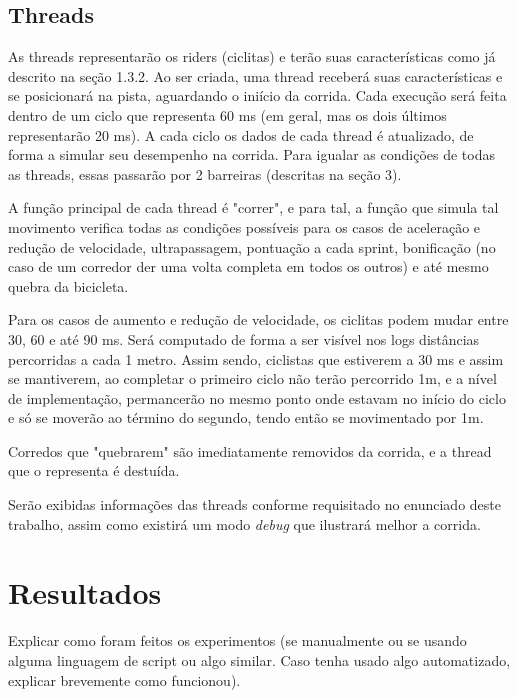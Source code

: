 \documentclass[12pt,a4paper]{article}
\begin{document}
\subsection{Threads}

    As threads representarão os riders (ciclitas) e terão suas características como já descrito na seção 1.3.2. Ao ser criada, uma thread receberá suas características e se posicionará na pista, aguardando o iniício da corrida. Cada execução será feita dentro de um ciclo que representa 60 ms (em geral, mas os dois últimos representarão 20 ms). A cada ciclo os dados de cada thread é atualizado, de forma a simular seu desempenho na corrida. Para igualar as condições de todas as threads, essas passarão por 2 barreiras (descritas na seção 3).
    
    A função principal de cada thread é "correr", e para tal, a função que simula tal movimento verifica todas as condições possíveis para os casos de aceleração e redução de velocidade, ultrapassagem, pontuação a cada sprint, bonificação (no caso de um corredor der uma volta completa em todos os outros) e até mesmo quebra da bicicleta.
    
    Para os casos de aumento e redução de velocidade, os ciclitas podem mudar entre 30, 60 e até 90 ms. Será computado de forma a ser visível nos logs distâncias percorridas a cada 1 metro. Assim sendo, ciclistas que estiverem a 30 ms e assim se mantiverem, ao completar o primeiro ciclo não terão percorrido 1m, e a nível de implementação, permancerão no mesmo ponto onde estavam no início do ciclo e só se moverão ao término do segundo, tendo então se movimentado por 1m.
    
    Corredos que "quebrarem" são imediatamente removidos da corrida, e a thread que o representa é destuída.
    
    Serão exibidas informações das threads conforme requisitado no enunciado deste trabalho, assim como existirá um modo \textit{debug} que ilustrará melhor a corrida.


\section{Resultados}

Explicar como foram feitos os experimentos (se manualmente ou se
usando alguma linguagem de script ou algo similar. Caso tenha usado
algo automatizado, explicar brevemente como funcionou).
\end{document}
